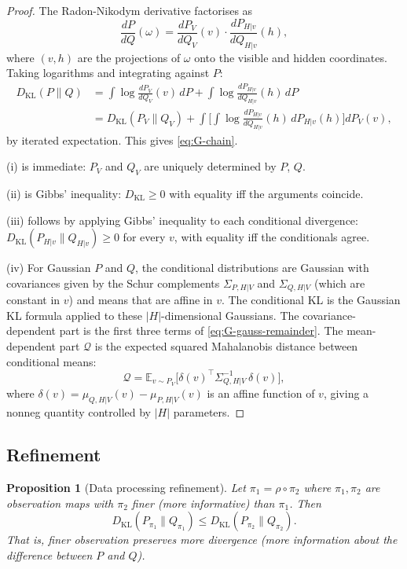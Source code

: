 \documentclass[11pt,a4paper]{article}
\numberwithin{equation}{section}
\theoremstyle{thmcompact}
\newtheorem{proposition}[theorem]{Proposition}
\theoremstyle{remark}
\begin{document}
\begin{proof}
The Radon-Nikodym derivative factorises as
\[
\frac{dP}{dQ}(\omega) = \frac{dP_V}{dQ_V}(v) \cdot \frac{dP_{H|v}}{dQ_{H|v}}(h),
\]
where $(v, h)$ are the projections of $\omega$ onto the visible and hidden coordinates. Taking logarithms and integrating against $P$:
\begin{align*}
D_{\mathrm{KL}}(P \| Q) &= \int \log\frac{dP_V}{dQ_V}(v)\,dP + \int \log\frac{dP_{H|v}}{dQ_{H|v}}(h)\,dP \\
&= D_{\mathrm{KL}}(P_V \| Q_V) + \int \biggl[\int \log\frac{dP_{H|v}}{dQ_{H|v}}(h)\,dP_{H|v}(h)\biggr]dP_V(v),
\end{align*}
by iterated expectation. This gives \eqref{eq:G-chain}.

(i) is immediate: $P_V$ and $Q_V$ are uniquely determined by $P$, $Q$.

(ii) is Gibbs' inequality: $D_{\mathrm{KL}} \geq 0$ with equality iff the arguments coincide.

(iii) follows by applying Gibbs' inequality to each conditional divergence: $D_{\mathrm{KL}}(P_{H|v} \| Q_{H|v}) \geq 0$ for every $v$, with equality iff the conditionals agree.

(iv) For Gaussian $P$ and $Q$, the conditional distributions are Gaussian with covariances given by the Schur complements $\Sigma_{P,H|V}$ and $\Sigma_{Q,H|V}$ (which are constant in $v$) and means that are affine in $v$. The conditional KL is the Gaussian KL formula applied to these $|H|$-dimensional Gaussians. The covariance-dependent part is the first three terms of \eqref{eq:G-gauss-remainder}. The mean-dependent part $\mathcal{Q}$ is the expected squared Mahalanobis distance between conditional means:
\[
\mathcal{Q} = \mathbb{E}_{v \sim P_V}\bigl[\delta(v)^\top \Sigma_{Q,H|V}^{-1}\,\delta(v)\bigr],
\]
where $\delta(v) = \mu_{Q,H|V}(v) - \mu_{P,H|V}(v)$ is an affine function of $v$, giving a nonneg quantity controlled by $|H|$ parameters.
\end{proof}

\subsection{Refinement}

\begin{proposition}[Data processing refinement]\label{prop:bridge-G-refine}
Let $\pi_1 = \rho \circ \pi_2$ where $\pi_1, \pi_2$ are observation maps with $\pi_2$ finer (more informative) than $\pi_1$. Then
\begin{equation}\label{eq:G-dpi}
D_{\mathrm{KL}}(P_{\pi_1} \| Q_{\pi_1}) \leq D_{\mathrm{KL}}(P_{\pi_2} \| Q_{\pi_2}).
\end{equation}
That is, finer observation preserves more divergence (more information about the difference between $P$ and $Q$).
\end{proposition}
\end{document}

